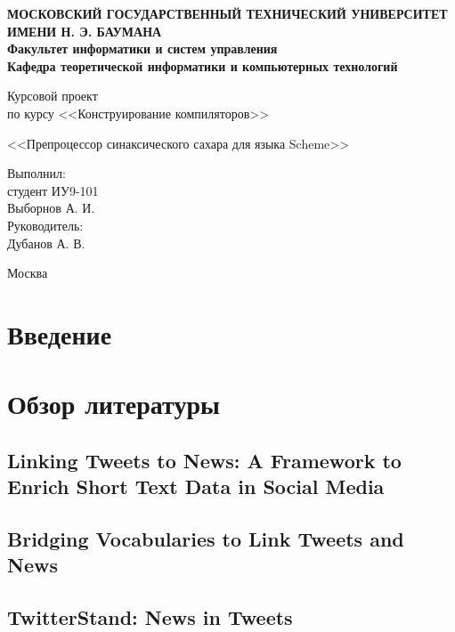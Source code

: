 \documentclass[12pt,a4paper,oneside]{extarticle}
\begin{document}
\pgfplotsset{compat=1.8}

\thispagestyle{empty}
\newpage
{
\centering


\textbf{
МОСКОВСКИЙ ГОСУДАРСТВЕННЫЙ ТЕХНИЧЕСКИЙ УНИВЕРСИТЕТ ИМЕНИ Н. Э. БАУМАНА \\
Факультет информатики и систем управления \\
Кафедра теоретической информатики и компьютерных технологий}
\bigskip
\bigskip
\bigskip
\bigskip
\bigskip
\bigskip
\bigskip

\vfill

Курсовой проект \\
по курсу <<Конструирование компиляторов>>

\bigskip

{\large <<Препроцессор синаксического сахара для языка Scheme>>}
\bigskip

\vfill



\hfill\parbox{4cm} {
Выполнил:\\
студент ИУ9-101 \hfill \\
Выборнов А. И.\hfill \medskip\\
Руководитель:\\
Дубанов А. В.\hfill
}


\vspace{\fill}

Москва \number\year
\clearpage
}


\tableofcontents

\clearpage

\section*{Введение}

\section{Обзор литературы}

    \subsection{Linking Tweets to News: A Framework to Enrich Short Text Data in Social Media}
    \subsection{Bridging Vocabularies to Link Tweets and News}
    \subsection{TwitterStand: News in Tweets}
\end{document}
